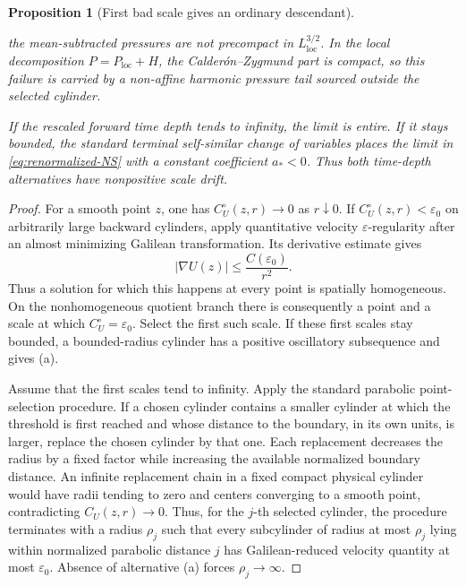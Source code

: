 \documentclass[11pt]{amsart}
\numberwithin{equation}{section}
\theoremstyle{plain}
\newtheorem{proposition}[proposition]{Proposition}
\theoremstyle{definition}
\theoremstyle{remark}
\begin{document}
\begin{proposition}[First bad scale gives an ordinary descendant]
\begin{enumerate}[label=\textup{(\alph*)},leftmargin=2.2em]
the mean-subtracted pressures are not precompact in
\(L^{3/2}_{\mathrm{loc}}\).  In the local decomposition
\(P=P_{\mathrm{loc}}+H\), the Calder\'on--Zygmund part is compact, so this
failure is carried by a non-affine harmonic pressure tail sourced outside the
selected cylinder.
\end{enumerate}
If the rescaled forward time depth tends to infinity, the limit is entire.
If it stays bounded, the standard terminal self-similar change of variables
places the limit in \eqref{eq:renormalized-NS} with a constant coefficient
\(a_*<0\).  Thus both time-depth alternatives have nonpositive scale drift.
\end{proposition}

\begin{proof}
For a smooth point \(z\), one has
\(C_U^\circ(z,r)\to0\) as \(r\downarrow0\).  If
\(C_U^\circ(z,r)<\varepsilon_0\) on arbitrarily large backward cylinders,
apply quantitative velocity \(\varepsilon\)-regularity after an almost
minimizing Galilean transformation.  Its derivative estimate gives
\[
 |\nabla U(z)|\le \frac{C(\varepsilon_0)}{r^2}.
\]
Thus a solution for which this happens at every point is spatially
homogeneous.  On the nonhomogeneous quotient branch there is consequently a
point and a scale at which \(C_U^\circ=\varepsilon_0\).  Select the first
such scale.  If these first scales stay bounded, a bounded-radius cylinder
has a positive oscillatory subsequence and gives \textup{(a)}.

Assume that the first scales tend to infinity.  Apply the standard parabolic
point-selection procedure.  If a chosen cylinder contains a smaller cylinder
at which the threshold is first reached and whose distance to the boundary,
in its own units, is larger, replace the chosen cylinder by that one.  Each
replacement decreases the radius by a fixed factor while increasing the
available normalized boundary distance.  An infinite replacement chain in a
fixed compact physical cylinder would have radii tending to zero and centers
converging to a smooth point, contradicting
\(C_U(z,r)\to0\).  Thus, for the \(j\)-th selected cylinder, the procedure
terminates with a radius \(\rho_j\) such that every subcylinder of radius at
most \(\rho_j\) lying within normalized parabolic distance \(j\) has
Galilean-reduced velocity quantity at most \(\varepsilon_0\).  Absence of alternative
\textup{(a)} forces \(\rho_j\to\infty\).


\end{proof}
\end{document}
